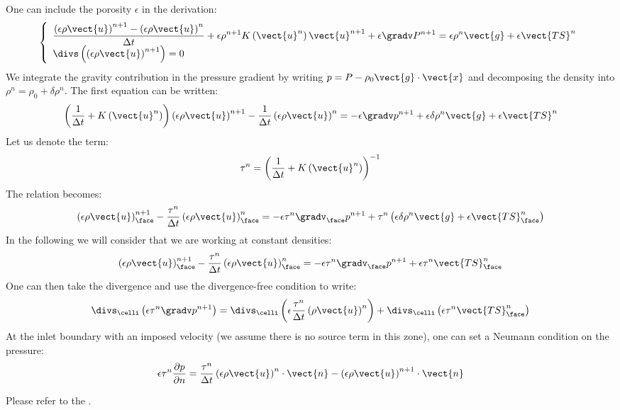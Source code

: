 One can include the porosity $\epsilon$ in the derivation:
\begin{equation}
    \left\lbrace\begin{array}{l}
    \displaystyle{}\frac{\left(\epsilon\rho\vect{u}\right)^{n+1}-\left(\epsilon\rho\vect{u}\right)^{n}}{\Delta t}+\epsilon\rho^{n+1}K\left(\vect{u}^{n}\right)\vect{u}^{n+1}+\epsilon\gradv P^{n+1}=\epsilon\rho^{n}\vect{g}+\epsilon\vect{TS}^{n} \\
    \displaystyle{}\divs\left(\left(\epsilon\rho\vect{u}\right)^{n+1}\right)=0
    \end{array}
    \right.
\end{equation}
We integrate the gravity contribution in the pressure gradient by writing
$p=P-\rho_{0}\vect{g}\cdot\vect{x}$ and decomposing the density into
$\rho^{n}=\rho_{0}+\delta\rho^{n}$. The first equation can be written:
\begin{equation}
    \left(\frac{1}{\Delta t}+K\left(\vect{u}^{n}\right)\right)\left(\epsilon\rho\vect{u}\right)^{n+1}-\frac{1}{\Delta t}\left(\epsilon\rho\vect{u}\right)^{n}=-\epsilon\gradv p^{n+1}+\epsilon\delta\rho^{n}\vect{g}+\epsilon\vect{TS}^{n}
\end{equation}
Let us denote the term:
\begin{equation}
    \tau^{n}=\left(\frac{1}{\Delta t}+K\left(\vect{u}^{n}\right)\right)^{-1}
\end{equation}
The relation becomes:
\begin{equation}
    \left(\epsilon\rho\vect{u}\right)_{\face}^{n+1}-\frac{\tau^{n}}{\Delta t}\left(\epsilon\rho\vect{u}\right)_{\face}^{n}=-\epsilon\tau^{n}\gradv_{\face} p^{n+1}+\tau^{n}\left(\epsilon\delta\rho^{n}\vect{g}+\epsilon\vect{TS}_{\face}^{n}\right)
\end{equation}
In the following we will consider that we are working at constant densities:
\begin{equation}
    \left(\epsilon\rho\vect{u}\right)_{\face}^{n+1}-\frac{\tau^{n}}{\Delta t}\left(\epsilon\rho\vect{u}\right)_{\face}^{n}=-\epsilon\tau^{n}\gradv_{\face} p^{n+1}+\epsilon\tau^{n}\vect{TS}_{\face}^{n}
\end{equation}
One can then take the divergence and use the divergence-free condition to
write:
\begin{equation}
    \divs_{\celli}\left(\epsilon\tau^{n}\gradv p^{n+1}\right)=\divs_{\celli}\left(\epsilon\frac{\tau^{n}}{\Delta t}\left(\rho\vect{u}\right)^{n}\right)+\divs_{\celli}\left(\epsilon\tau^{n}\vect{TS}_{\face}^{n}\right)
\end{equation}
At the inlet boundary with an imposed velocity (we assume there is no
source term in this zone), one can set a Neumann condition on the pressure:
\begin{equation}
    \epsilon\tau^{n}\frac{\partial p}{\partial n}=\frac{\tau^{n}}{\Delta t}\left(\epsilon\rho\vect{u}\right)^{n}\cdot\vect{n}-\left(\epsilon\rho\vect{u}\right)^{n+1}\cdot\vect{n}
\end{equation}

Please refer to the .

